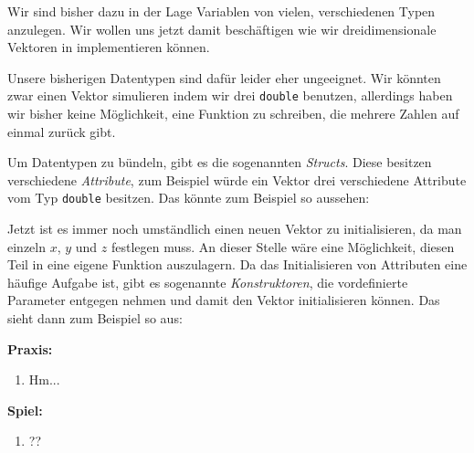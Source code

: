 
Wir sind bisher dazu in der Lage Variablen von vielen, verschiedenen Typen anzulegen.
Wir wollen uns jetzt damit beschäftigen wie wir dreidimensionale Vektoren in \Cpp implementieren können.

Unsere bisherigen Datentypen sind dafür leider eher ungeeignet.
Wir könnten zwar einen Vektor simulieren indem wir drei \texttt{double} benutzen, allerdings haben wir bisher keine Möglichkeit, eine Funktion zu schreiben, die mehrere Zahlen auf einmal zurück gibt.

Um Datentypen zu bündeln, gibt es die sogenannten \emph{Structs}.
Diese besitzen verschiedene \emph{Attribute}, zum Beispiel würde ein Vektor drei verschiedene Attribute vom Typ \texttt{double} besitzen.
Das könnte zum Beispiel so aussehen:


Jetzt ist es immer noch umständlich einen neuen Vektor zu initialisieren, da man einzeln $x$, $y$ und $z$ festlegen muss.
An dieser Stelle wäre eine Möglichkeit, diesen Teil in eine eigene Funktion auszulagern.
Da das Initialisieren von Attributen eine häufige Aufgabe ist, gibt es sogenannte \emph{Konstruktoren}, die vordefinierte Parameter entgegen nehmen und damit den Vektor initialisieren können. %
Das sieht dann zum Beispiel so aus:


\textbf{Praxis:}
\begin{enumerate}
	\item Hm...
\end{enumerate}

\textbf{Spiel:}
\begin{enumerate}
	\item ??
\end{enumerate}
